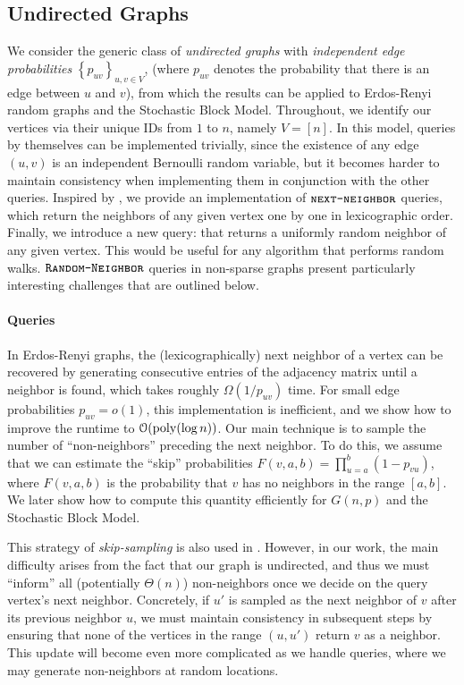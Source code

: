 \subsection{Undirected Graphs}
\label{sec:undirected_graphs}
We consider the generic class of \emph{undirected graphs} with {\em independent edge probabilities} $\left\{ p_{uv} \right\}_{u,v\in V}$,
(where $p_{uv}$ denotes the probability that there is an edge between $u$ and $v$),
from which the results can be applied to Erdos-Renyi random graphs and the Stochastic Block Model.
Throughout, we identify our vertices via their unique IDs from $1$ to $n$, namely $V = [n]$.
In this model,  queries by themselves can be implemented trivially,
since the existence of any edge $(u,v)$ is an independent Bernoulli random variable,
but it becomes harder to maintain consistency when implementing them in conjunction with the other queries.
Inspired by \cite{reut}, we provide an implementation of $\texttt{\textsc{next-neighbor}}$ queries,
which return the neighbors of any given vertex one by one in lexicographic order.
Finally, we introduce a new query:  that returns a uniformly random neighbor of any given vertex.
This would be useful for any algorithm that performs random walks.
$\texttt{\textsc{Random-Neighbor}}$ queries in non-sparse graphs present particularly interesting challenges that are outlined below.

\paragraph*{ Queries}
\label{par:next_neighbor_queries}
In Erdos-Renyi graphs, the (lexicographically) next neighbor of a vertex can be recovered by generating consecutive entries
of the adjacency matrix until a neighbor is found, which takes roughly $\Omega(1/p_{uv})$ time.
For small edge probabilities $p_{uv} = o(1)$, this implementation is inefficient, and we show how to improve the runtime to $\mathcal O(\mathrm{poly}(\log n))$.
Our main technique is to sample the number of ``non-neighbors'' preceding the next neighbor.
To do this, we assume that we can estimate the ``skip'' probabilities $F(v,a,b)=\prod^{b}_{u=a} (1-p_{vu})$,
where $F(v,a,b)$ is the probability that $v$ has no neighbors in the range $[a,b]$.
We later show how to compute this quantity efficiently for $G(n,p)$ and the Stochastic Block Model.

This strategy of \emph{skip-sampling} is also used in \cite{reut}.
However, in our work, the main difficulty arises from the fact that our graph is undirected,
and thus we must ``inform'' all (potentially $\Theta(n)$) non-neighbors once we decide on the query vertex's next neighbor.
Concretely, if $u'$ is sampled as the next neighbor of $v$ after its previous neighbor $u$,
we must maintain consistency in subsequent steps by ensuring that none of the vertices in the range $(u,u')$ return $v$ as a neighbor.
This update will become even more complicated as we handle  queries, where we may generate non-neighbors at random locations.

